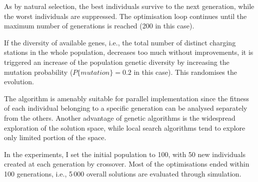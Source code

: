 As by natural selection, the best individuals survive to the next generation, while the worst individuals are suppressed. 
The optimisation loop continues until the maximum number of generations is reached (200 in this case).

If the diversity of available genes, i.e., the total number of distinct charging stations in the whole population, decreases too much without improvements, it is triggered an increase of the population genetic diversity by increasing the mutation probability ($P\{mutation\}=0.2$ in this case). This randomises the evolution.

The algorithm is amenably suitable for parallel implementation since the fitness of each individual belonging to a specific generation can be analysed separately from the others. Another advantage of genetic algorithms is the widespread exploration of the solution space, while local search algorithms tend to explore only limited portion of the space.

In the experiments, I set the initial population to 100, with 50 new individuals created at each generation by crossover. Most of the optimisations ended within 100 generations, i.e., 5\,000 overall solutions are evaluated through simulation.